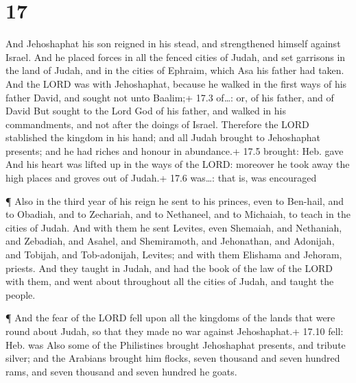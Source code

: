 \hypertarget{section-16}{%
\section{17}\label{section-16}}

 And Jehoshaphat his son reigned in his stead, and
strengthened himself against Israel.  And he placed forces
in all the fenced cities of Judah, and set garrisons in the land of
Judah, and in the cities of Ephraim, which Asa his father had taken.
 And the LORD was with Jehoshaphat, because he walked in the
first ways of his father David, and sought not unto Baalim;+ 17.3
of\ldots: or, of his father, and of David  But sought to the
Lord God of his father, and walked in his commandments, and not after
the doings of Israel.  Therefore the LORD stablished the
kingdom in his hand; and all Judah brought to Jehoshaphat presents; and
he had riches and honour in abundance.+ 17.5 brought: Heb. gave
 And his heart was lifted up in the ways of the LORD:
moreover he took away the high places and groves out of Judah.+ 17.6
was\ldots: that is, was encouraged

 ¶ Also in the third year of his reign he sent to his
princes, even to Ben-hail, and to Obadiah, and to Zechariah, and to
Nethaneel, and to Michaiah, to teach in the cities of Judah.
 And with them he sent Levites, even Shemaiah, and
Nethaniah, and Zebadiah, and Asahel, and Shemiramoth, and Jehonathan,
and Adonijah, and Tobijah, and Tob-adonijah, Levites; and with them
Elishama and Jehoram, priests.  And they taught in Judah,
and had the book of the law of the LORD with them, and went about
throughout all the cities of Judah, and taught the people.

 ¶ And the fear of the LORD fell upon all the kingdoms of
the lands that were round about Judah, so that they made no war against
Jehoshaphat.+ 17.10 fell: Heb. was  Also some of the
Philistines brought Jehoshaphat presents, and tribute silver; and the
Arabians brought him flocks, seven thousand and seven hundred rams, and
seven thousand and seven hundred he goats.

